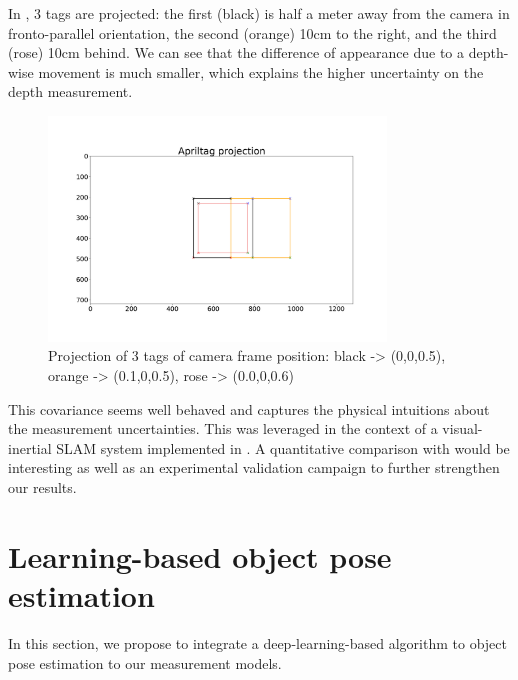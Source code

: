 In , 3 tags are projected: the first (black) is half a meter away from the camera in fronto-parallel orientation, the second (orange)
10cm to the right, and the third (rose) 10cm behind. We can see that the difference of appearance due to a depth-wise movement is much smaller, which 
explains the higher uncertainty on the depth measurement.

\begin{figure}[h]
    \centering
    \includegraphics[width=0.8\textwidth]{figures/apriltag_proj.pdf}
    \caption{Projection of 3 tags of camera frame position: black -> (0,0,0.5), orange -> (0.1,0,0.5), rose -> (0.0,0,0.6)}
    \label{fig:apriltag_proj}
\end{figure}

This covariance seems well behaved and captures the physical intuitions about the measurement uncertainties. 
This was leveraged in the context of a visual-inertial SLAM system implemented in . 
A quantitative comparison with \cite{urban2016mlpnp} would be interesting as well as an experimental validation campaign to further strengthen our results.


%
%
%
%
\section{Learning-based object pose estimation}
\label{sec:learning_based_object_pose_est}
In this section, we propose to integrate a deep-learning-based algorithm to object pose estimation \cite{labbe2020cosypose} to our measurement models. 


